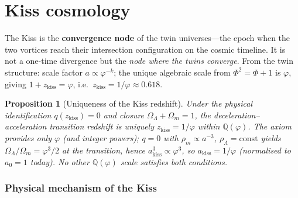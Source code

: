 \documentclass[12pt,a4paper]{article}
\newtheorem{proposition}[theorem]{Proposition}
\begin{document}
\section{Kiss cosmology}
\label{sec:kiss}
\label{sec:trunk-kiss}
\label{sec:trunk-cosmo}
\label{sec:kiss-universal}

The Kiss is the \textbf{convergence node} of the twin universes---the epoch when the two vortices reach their intersection configuration on the cosmic timeline. It is not a one-time divergence but the \emph{node where the twins converge}. From the twin structure: scale factor $a \propto \varphi^{-k}$; the unique algebraic scale from $\Phi^2 = \Phi + 1$ is $\varphi$, giving $1+z_{\mathrm{kiss}} = \varphi$, i.e.\ $z_{\mathrm{kiss}} = 1/\varphi \approx 0.618$.

\begin{proposition}[Uniqueness of the Kiss redshift]
\label{prop:kiss-uniqueness}
Under the physical identification $q(z_{\mathrm{kiss}}) = 0$ and closure $\Omega_\Lambda + \Omega_m = 1$, the deceleration--acceleration transition redshift is uniquely $z_{\mathrm{kiss}} = 1/\varphi$ within $\mathbb{Q}(\varphi)$. The axiom provides only $\varphi$ (and integer powers); $q=0$ with $\rho_m \propto a^{-3}$, $\rho_\Lambda = \mathrm{const}$ yields $\Omega_\Lambda/\Omega_m = \varphi^3/2$ at the transition, hence $a_{\mathrm{kiss}}^3 \propto \varphi^3$, so $a_{\mathrm{kiss}} = 1/\varphi$ (normalised to $a_0 = 1$ today). No other $\mathbb{Q}(\varphi)$ scale satisfies both conditions.
\end{proposition}

\subsubsection{Physical mechanism of the Kiss}
\label{sec:kiss-mechanism}
\end{document}
